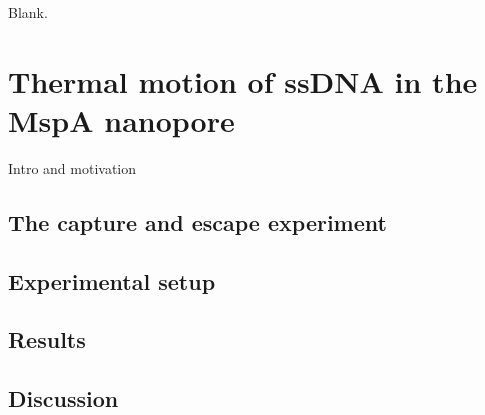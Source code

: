 \begin{savequote}[75mm]
Blank.
\end{savequote}

\chapter{Thermal motion of ssDNA in the MspA nanopore}
\label{dna_thermal_motion_mspa}

Intro and motivation

\section{The capture and escape experiment}

\section{Experimental setup}

\section{Results}

\section{Discussion}
